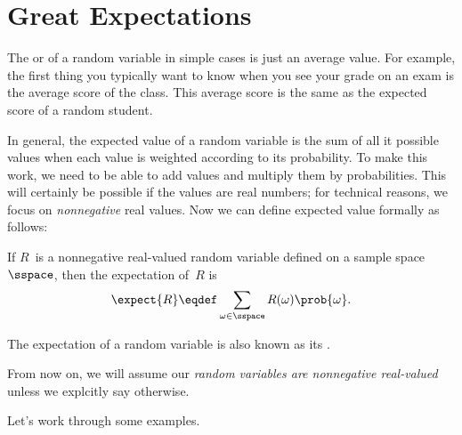 \begin{problems}
\practiceproblems
{}

\classproblems
{}

\homeworkproblems
\end{problems}


\section{Great Expectations}\label{expectation_sec}

The  or  of a random variable
in simple cases is just an average value.  For example, the first
thing you typically want to know when you see your grade on an exam is
the average score of the class.  This average score is the same as the
expected score of a random student.

In general, the expected value of a random variable is the sum of all
it possible values when each value is weighted according to its
probability.  To make this work, we need to be able to add values and
multiply them by probabilities.  This will certainly be possible if
the values are real numbers; for technical reasons, we focus on
\emph{nonnegative} real values.  Now we can define expected value
formally as follows:
\begin{definition}\label{def:expectation}
If $R$~is a nonnegative real-valued random variable defined on a
sample space~$\sspace$, then the expectation of~$R$ is
\begin{equation}\label{eqn:expectation}
    \expect{R} \eqdef \sum_{\omega \in \sspace} R(\omega) \prob{\omega}.
\end{equation}
\end{definition}
The expectation of a random variable is also known as its .

From now on, we will assume our \emph{random variables are nonnegative
  real-valued} unless we explcitly say otherwise.

Let's work through some examples.

